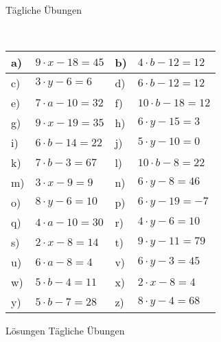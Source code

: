 \documentclass[12pt]{article}
\begin{document}
\centerline{{\Large Tägliche Übungen}} 
\vspace{1cm}
\noindent \\


\begin{xltabular}{\textwidth}{|C{0.75cm}|X|C{0.75cm}|X|}
\hline
a)&$9\cdot x-18=45$
&
b)&$4\cdot b-12=12$
\\\hline
c)&$3\cdot y-6=6$
&
d)&$6\cdot b-12=12$
\\\hline
e)&$7\cdot a-10=32$
&
f)&$10\cdot b-18=12$
\\\hline
g)&$9\cdot x-19=35$
&
h)&$6\cdot y-15=3$
\\\hline
i)&$6\cdot b-14=22$
&
j)&$5\cdot y-10=0$
\\\hline
k)&$7\cdot b-3=67$
&
l)&$10\cdot b-8=22$
\\\hline
m)&$3\cdot x-9=9$
&
n)&$6\cdot y-8=46$
\\\hline
o)&$8\cdot y-6=10$
&
p)&$6\cdot y-19=-7$
\\\hline
q)&$4\cdot a-10=30$
&
r)&$4\cdot y-6=10$
\\\hline
s)&$2\cdot x-8=14$
&
t)&$9\cdot y-11=79$
\\\hline
u)&$6\cdot a-8=4$
&
v)&$6\cdot y-3=45$
\\\hline
w)&$5\cdot b-4=11$
&
x)&$2\cdot x-8=4$
\\\hline
y)&$5\cdot b-7=28$
&
z)&$8\cdot y-4=68$
\\\hline
\end{xltabular}
\vspace{0.5cm}
\newpage
{}
\centerline{{\large Lösungen Tägliche Übungen}} 
\vspace{0.5cm}
\end{document}
